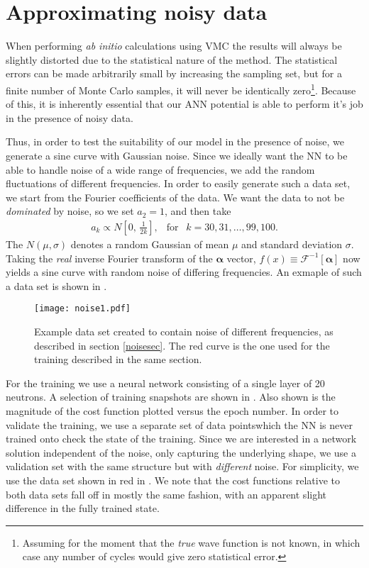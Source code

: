 \documentclass[../../master.tex]{subfiles}
\begin{document}
\section{Approximating noisy data \label{noisesec}}
When performing \emph{ab initio} calculations using VMC the results will always be slightly distorted due to the statistical nature of the method. The statistical errors can be made arbitrarily small by increasing the sampling set, but for a finite number of Monte Carlo samples, it will never be identically zero\footnote{Assuming for the moment that the \emph{true} wave function is not known, in which case any number of cycles would give zero statistical error.}. Because of this, it is inherently essential that our ANN potential is able to perform it's job in the presence of noisy data. 

Thus, in order to test the suitability of our model in the presence of noise, we generate a sine curve with Gaussian noise. Since we ideally want the NN to be able to handle noise of a wide range of frequencies, we add the random fluctuations of different frequencies. In order to easily generate such a data set, we start from the Fourier coefficients of the data. We want the data to not be \emph{dominated} by noise, so we set $a_2=1$, and then take
\begin{align}
a_k\propto N\left[0,\,\frac{1}{2k}\right], \ \ \text{ for } \ \ k=30,31,\dots,99,100.
\end{align}
The $N(\mu,\sigma)$ denotes a random Gaussian of mean $\mu$ and standard deviation $\sigma$. Taking the \emph{real} inverse Fourier transform of the $\bm{\alpha}$ vector, $f(x)\equiv\mathcal{F}^{-1}[\bm{\alpha}]$ now yields a sine curve with random noise of differing frequencies. An exmaple of such a data set is shown in .  
\begin{SCfigure}
\centering
\texttt{[image: noise1.pdf]}
\caption{Example data set created to contain noise of different frequencies, as described in section \ref{noisesec}. The red curve is the one used for the training described in the same section.\label{fig:noise1}}
\end{SCfigure}

For the training we use a neural network consisting of a single layer of 20 neutrons. A selection of training snapshots are shown in . Also shown is the magnitude of the cost function plotted versus the epoch number. In order to validate the training, we use a separate set of data points\textemdash which the NN is never trained on\textemdash to check the state of the training. Since we are interested in a network solution independent of the noise, only capturing the underlying shape, we use a validation set with the same structure but with \emph{different} noise. For simplicity, we use the data set shown in red in . We note that the cost functions relative to both data sets fall off in mostly the same fashion, with an apparent slight difference in the fully trained state. 
\end{document}
